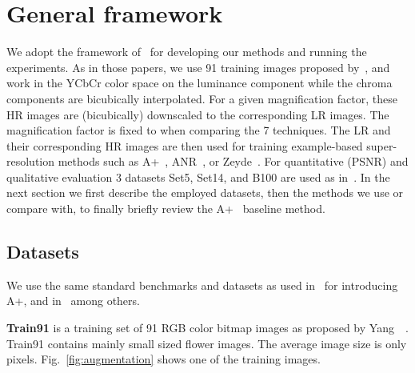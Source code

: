 \documentclass[10pt,twocolumn,letterpaper]{article}
\begin{document}
\section{General framework}
\label{sec:framework}
We adopt the framework of~\cite{Timofte-ICCV-2013,Timofte-ACCV-2014} for developing our methods and running the experiments. 
As in those papers, we use 91 training images proposed by~\cite{Yang-CVPR-2008}, and work in the YCbCr color space on the luminance component while the chroma components are bicubically interpolated.
For a given magnification factor, these HR images are (bicubically) downscaled to the corresponding LR images. The magnification factor is fixed to  when comparing the 7 techniques. 
The LR and their corresponding HR images are then used for training example-based super-resolution methods such as A+~\cite{Timofte-ACCV-2014}, ANR~\cite{Timofte-ICCV-2013},
or Zeyde~\cite{Zeyde-CS-2012}. For quantitative (PSNR) and qualitative evaluation 3 datasets Set5, Set14, and B100 are used as in~\cite{Timofte-ACCV-2014}.
In the next section we first describe the employed datasets, then the methods we use or compare with, to finally briefly review the A+~\cite{Timofte-ACCV-2014} baseline method.

\subsection{Datasets}
\label{ssc:datasets}
We use the same standard benchmarks and datasets as used in~\cite{Timofte-ACCV-2014} for introducing A+, and in~\cite{Yang-CVPR-2008, Zeyde-CS-2012, Timofte-ICCV-2013, Perez-ACCV-2014, Dong-ECCV-2014, Schulter-CVPR-2015, Dong-PAMI-2015} among others.

\noindent\textbf{Train91 } is a training set of 91 RGB color bitmap images as proposed by Yang~\etal~\cite{Yang-CVPR-2008}. Train91 contains mainly small sized flower images. The average image size is only  pixels.
Fig.~\ref{fig:augmentation} shows one of the training images.
\end{document}
